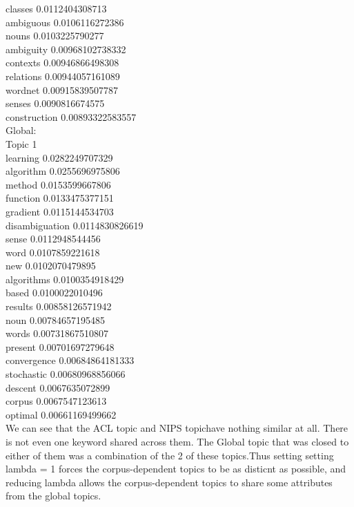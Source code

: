 \documentclass{article}
\begin{document}
{classes 0.0112404308713\\
ambiguous 0.0106116272386\\
nouns 0.0103225790277\\
ambiguity 0.00968102738332\\
contexts 0.00946866498308\\
relations 0.00944057161089\\
wordnet 0.00915839507787\\
senses 0.0090816674575\\
construction 0.00893322583557\\
Global:\\
Topic 1\\
learning 0.0282249707329\\
algorithm 0.0255696975806\\
method 0.0153599667806\\
function 0.0133475377151\\
gradient 0.0115144534703\\
disambiguation 0.0114830826619\\
sense 0.0112948544456\\
word 0.0107859221618\\
new 0.0102070479895\\
algorithms 0.0100354918429\\
based 0.0100022010496\\
results 0.00858126571942\\
noun 0.00784657195485\\
words 0.00731867510807\\
present 0.00701697279648\\
convergence 0.00684864181333\\
stochastic 0.00680968856066\\
descent 0.0067635072899\\
corpus 0.0067547123613\\
optimal 0.00661169499662\\

We can see that the ACL topic and NIPS topichave nothing similar at all. There is not even one keyword shared across them. The Global topic that was closed to either of them was a combination of the 2 of these topics.Thus setting setting lambda = 1 forces the corpus-dependent topics to be as disticnt as possible, and reducing lambda allows the corpus-dependent topics to share some attributes from the global topics.

}
\end{document}
